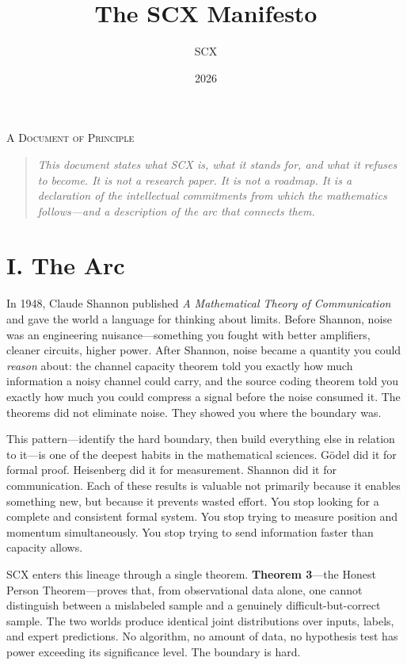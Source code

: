\documentclass[11pt,a4paper]{article}
\title{\textbf{The SCX Manifesto}}
\author{SCX}
\date{2026}
\theoremstyle{definition}
\begin{document}
\maketitle
\thispagestyle{empty}

\vspace{-1.5em}

\begin{center}
{\small \textsc{A Document of Principle}}
\end{center}

\vspace{1em}

\begin{quote}
\small
\textit{This document states what SCX is, what it stands for, and what it refuses to become. It is not a research paper. It is not a roadmap. It is a declaration of the intellectual commitments from which the mathematics follows---and a description of the arc that connects them.}
\end{quote}

\section*{I. The Arc}

In 1948, Claude Shannon published \textit{A Mathematical Theory of Communication} and gave the world a language for thinking about limits. Before Shannon, noise was an engineering nuisance---something you fought with better amplifiers, cleaner circuits, higher power. After Shannon, noise became a quantity you could \textit{reason} about: the channel capacity theorem told you exactly how much information a noisy channel could carry, and the source coding theorem told you exactly how much you could compress a signal before the noise consumed it. The theorems did not eliminate noise. They showed you where the boundary was.

This pattern---identify the hard boundary, then build everything else in relation to it---is one of the deepest habits in the mathematical sciences. G\"{o}del did it for formal proof. Heisenberg did it for measurement. Shannon did it for communication. Each of these results is valuable not primarily because it enables something new, but because it prevents wasted effort. You stop looking for a complete and consistent formal system. You stop trying to measure position and momentum simultaneously. You stop trying to send information faster than capacity allows.

SCX enters this lineage through a single theorem. \textbf{Theorem 3}---the Honest Person Theorem---proves that, from observational data alone, one cannot distinguish between a mislabeled sample and a genuinely difficult-but-correct sample. The two worlds produce identical joint distributions over inputs, labels, and expert predictions. No algorithm, no amount of data, no hypothesis test has power exceeding its significance level. The boundary is hard.
\end{document}
